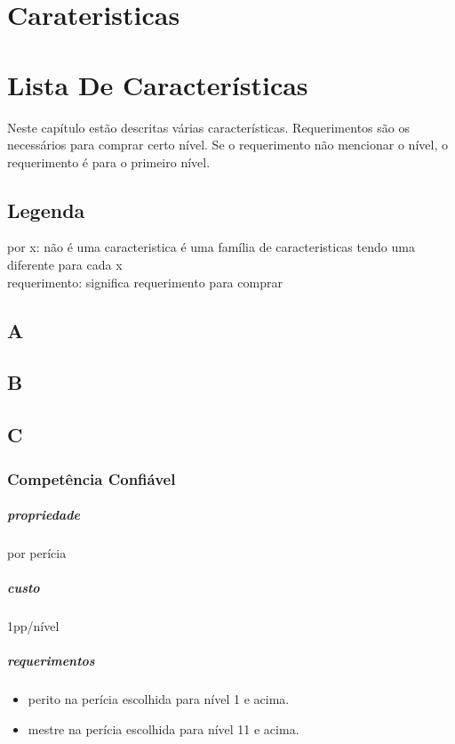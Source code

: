 \chapter{Carateristicas}
%
%
%
%
\chapter{Lista De Características}

Neste capítulo estão descritas várias características.
Requerimentos são os necessários para comprar certo nível.
Se o requerimento não mencionar o nível,
o requerimento é para o primeiro nível.

\section{Legenda}
por x: não é uma caracteristica é
uma família de caracteristicas tendo uma diferente para cada x
\\
requerimento: significa requerimento para comprar \\
\section{A}
\section{B}
\section{C}
\subsection{Competência Confiável}
\paragraph{propriedade} por perícia
\paragraph{custo} 1pp/nível
\paragraph{requerimentos}
\begin{itemize}
  \item perito na perícia escolhida para nível 1 e acima.
  \item mestre na perícia escolhida para nível 11 e acima.
\end{itemize}

